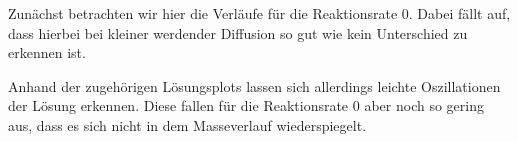 Zunächst betrachten wir hier die Verläufe für die Reaktionsrate $0$. Dabei fällt auf, dass hierbei bei kleiner werdender Diffusion so gut wie kein Unterschied zu erkennen ist. 

\begin{figure}[H]
	\centering
\end{figure}

Anhand der zugehörigen Lösungsplots lassen sich allerdings leichte Oszillationen der Lösung erkennen. Diese fallen für die Reaktionsrate $0$ aber noch so gering aus, dass es sich nicht in dem Masseverlauf wiederspiegelt.

